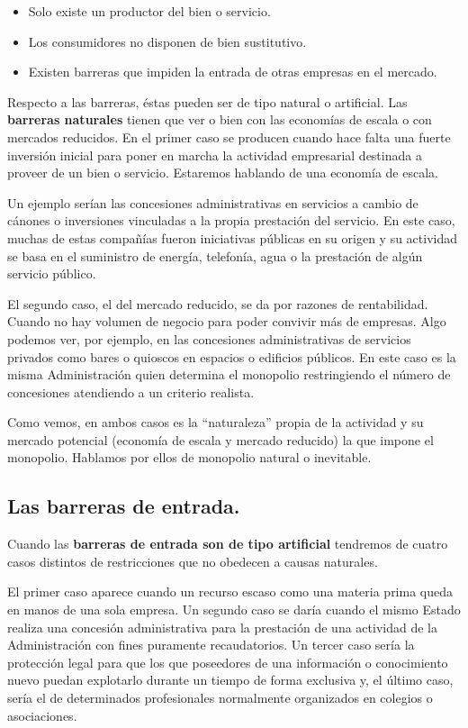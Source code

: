\documentclass[
]{article}
\begin{document}
\begin{itemize}
\item
  Solo existe un productor del bien o servicio.
\item
  Los consumidores no disponen de bien sustitutivo.
\item
  Existen barreras que impiden la entrada de otras empresas en el
  mercado.
\end{itemize}

Respecto a las barreras, éstas pueden ser de tipo natural o artificial.
Las \textbf{barreras naturales} tienen que ver o bien con las economías
de escala o con mercados reducidos. En el primer caso se producen cuando
hace falta una fuerte inversión inicial para poner en marcha la
actividad empresarial destinada a proveer de un bien o servicio.
Estaremos hablando de una economía de escala.

Un ejemplo serían las concesiones administrativas en servicios a cambio
de cánones o inversiones vinculadas a la propia prestación del servicio.
En este caso, muchas de estas compañías fueron iniciativas públicas en
su origen y su actividad se basa en el suministro de energía, telefonía,
agua o la prestación de algún servicio público.

El segundo caso, el del mercado reducido, se da por razones de
rentabilidad. Cuando no hay volumen de negocio para poder convivir más
de empresas. Algo podemos ver, por ejemplo, en las concesiones
administrativas de servicios privados como bares o quioscos en espacios
o edificios públicos. En este caso es la misma Administración quien
determina el monopolio restringiendo el número de concesiones atendiendo
a un criterio realista.

Como vemos, en ambos casos es la ``naturaleza'' propia de la actividad y
su mercado potencial (economía de escala y mercado reducido) la que
impone el monopolio. Hablamos por ellos de monopolio natural o
inevitable.

\hypertarget{las-barreras-de-entrada.}{%
\subsection*{Las barreras de entrada.}\label{las-barreras-de-entrada.}}

Cuando las \textbf{barreras de entrada son de tipo artificial} tendremos
de cuatro casos distintos de restricciones que no obedecen a causas
naturales.

El primer caso aparece cuando un recurso escaso como una materia prima
queda en manos de una sola empresa. Un segundo caso se daría cuando el
mismo Estado realiza una concesión administrativa para la prestación de
una actividad de la Administración con fines puramente recaudatorios. Un
tercer caso sería la protección legal para que los que poseedores de una
información o conocimiento nuevo puedan explotarlo durante un tiempo de
forma exclusiva y, el último caso, sería el de determinados
profesionales normalmente organizados en colegios o asociaciones.
\end{document}
